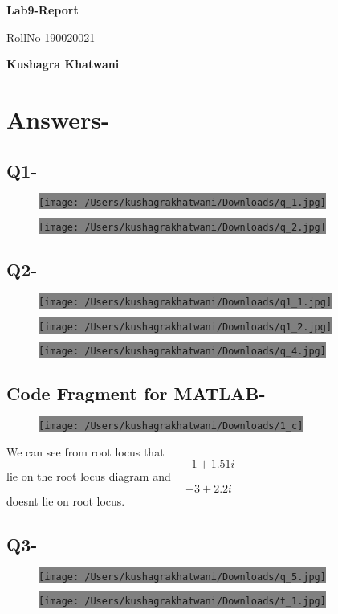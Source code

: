 \documentclass[12pt,A4paper]{article}
\begin{document}
        \begin{center}
        \vspace*{1cm}    
        \Huge
        \textbf{Lab9-Report}
            
        \vspace{0.5cm}
        \LARGE
        RollNo-190020021
            
        \vspace{0.5cm}
            
        \textbf{Kushagra Khatwani}
	\end{center}
	
	\vspace{.5cm}
	
	\section*{Answers-}
	\subsection*{Q1-}
		\begin{figure}[H]
		\centering
		\colorbox{gray}{\texttt{[image: /Users/kushagrakhatwani/Downloads/q\_1.jpg]}}
	\end{figure}
		\begin{figure}[H]
		\centering
		\colorbox{gray}{\texttt{[image: /Users/kushagrakhatwani/Downloads/q\_2.jpg]}}
	\end{figure}
		\subsection*{Q2-}
		\begin{figure}[H]
		\centering
		\colorbox{gray}{\texttt{[image: /Users/kushagrakhatwani/Downloads/q1\_1.jpg]}}
	\end{figure}
			\begin{figure}[H]
		\centering
		\colorbox{gray}{\texttt{[image: /Users/kushagrakhatwani/Downloads/q1\_2.jpg]}}
	\end{figure}
	\begin{figure}[H]
		\centering
		\colorbox{gray}{\texttt{[image: /Users/kushagrakhatwani/Downloads/q\_4.jpg]}}
	\end{figure}
	\subsection*{Code Fragment for MATLAB-}

	
		\begin{figure}[H]
		\centering
		\colorbox{gray}{\texttt{[image: /Users/kushagrakhatwani/Downloads/1\_c]}}
	\end{figure}
	We can see from root locus that $$-1+1.51i$$ lie on the root locus diagram and $$-3+2.2i$$ doesnt lie on root locus.
		\subsection*{Q3-}
			\begin{figure}[H]
		\centering
		\colorbox{gray}{\texttt{[image: /Users/kushagrakhatwani/Downloads/q\_5.jpg]}}
	\end{figure}
	\begin{figure}[H]
		\centering
		\colorbox{gray}{\texttt{[image: /Users/kushagrakhatwani/Downloads/t\_1.jpg]}}
	\end{figure}
\end{document}
